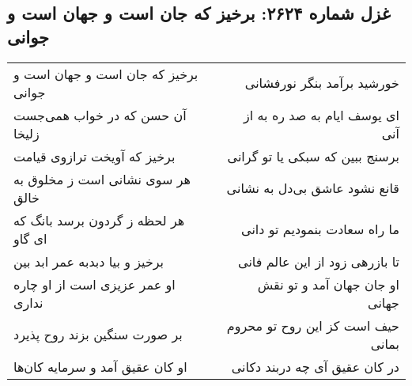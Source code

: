 \begin{center}
\section*{غزل شماره ۲۶۲۴: برخیز که جان است و جهان است و جوانی}
\label{sec:2624}
\begin{longtable}{l p{0.5cm} r}
برخیز که جان است و جهان است و جوانی
&&
خورشید برآمد بنگر نورفشانی
\\
آن حسن که در خواب همی‌جست زلیخا
&&
ای یوسف ایام به صد ره به از آنی
\\
برخیز که آویخت ترازوی قیامت
&&
برسنج ببین که سبکی یا تو گرانی
\\
هر سوی نشانی است ز مخلوق به خالق
&&
قانع نشود عاشق بی‌دل به نشانی
\\
هر لحظه ز گردون برسد بانگ که ای گاو
&&
ما راه سعادت بنمودیم تو دانی
\\
برخیز و بیا دبدبه عمر ابد بین
&&
تا بازرهی زود از این عالم فانی
\\
او عمر عزیزی است از او چاره نداری
&&
او جان جهان آمد و تو نقش جهانی
\\
بر صورت سنگین بزند روح پذیرد
&&
حیف است کز این روح تو محروم بمانی
\\
او کان عقیق آمد و سرمایه کان‌ها
&&
در کان عقیق آی چه دربند دکانی
\\
\end{longtable}
\end{center}
